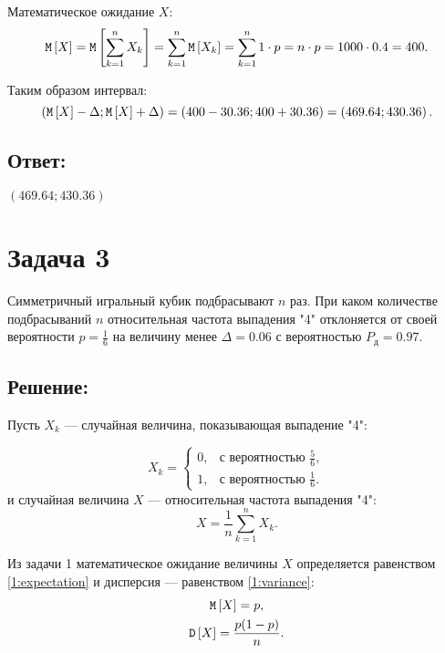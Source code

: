 Математическое ожидание $X$:
\begin{equation}
    \mathtt{M} \left [ X \right ] = \mathtt{M} \left [ \sum_{k=1}^n X_k \right ] = \sum_{k=1}^n \mathtt{M} \left [ X_k \right ] = \sum_{k=1}^n 1 \cdot p = n \cdot p = 1000 \cdot 0.4 = 400 .
\end{equation}

Таким образом интервал:
\begin{equation}
    \left ( \mathtt{M} \left [ X \right ] - \Delta ; \mathtt{M} \left [ X \right ] + \Delta \right )
    = \left ( 400 - 30.36 ; 400 + 30.36 \right )
    = \left ( 469.64 ; 430.36 \right ) .
\end{equation}
\subsection*{Ответ:}
$\left ( 469.64 ; 430.36 \right )$

\section*{Задача 3}

Симметричный игральный кубик подбрасывают $n$ раз. При каком количестве подбрасываний $n$ относительная частота выпадения "4"{} отклоняется от своей вероятности
$p = \frac{1}{6}$ на величину менее $\Delta = 0.06$ с вероятностью $P_\text{д} = 0.97$.

\subsection*{Решение:}
Пусть $X_k$ --- случайная величина, показывающая выпадение "4":

\begin{equation}
    X_k =
    \left \{
    \begin{array}{ll}
        0, & \text{с вероятностью } \frac{5}{6},  \\
        1, & \text{с вероятностью } \frac{1}{6} .
    \end{array}
    \right .
\end{equation}
и случайная величина $X$ --- относительная частота выпадения "4":
\begin{equation}
    X = \frac{1}{n} \sum_{k=1}^n X_k .
\end{equation}

Из задачи 1 математическое ожидание величины $X$ определяется равенством \eqref{1:expectation} и дисперсия --- равенством \eqref{1:variance}:
\begin{gather}
    \mathtt{M} \left [ X \right ] = p, \\
    \mathtt{D} \left [ X \right ] = \frac{p ( 1 - p )}{n} .
\end{gather}


